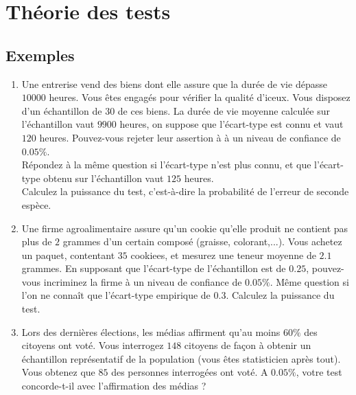 \section{Théorie des tests}

\subsection{Exemples}
\begin{enumerate}
\item Une entrerise vend des biens dont elle assure que la durée de vie dépasse $10000$ heures. Vous êtes engagés pour vérifier la qualité d'iceux. Vous disposez d'un échantillon de $30$ de ces biens. La durée de vie moyenne calculée sur l'échantillon vaut $9900$ heures, on suppose que l'écart-type est connu et vaut $120$ heures. Pouvez-vous rejeter leur assertion à à un niveau de confiance de $0.05\%$.\\
Répondez à la même question si l'écart-type n'est plus connu, et que l'écart-type obtenu sur l'échantillon vaut $125$ heures.\\
Calculez la puissance du test, c'est-à-dire la probabilité de l'erreur de seconde espèce.

\item Une firme agroalimentaire assure qu'un cookie qu'elle produit ne contient pas plus de $2$ grammes d'un certain composé (graisse, colorant,...). Vous achetez un paquet, contentant $35$ cookiees, et mesurez une teneur moyenne de $2.1$ grammes. En supposant que l'écart-type de l'échantillon est de $0.25$, pouvez-vous incriminez la firme à un niveau de confiance de $0.05\%$. Même question si l'on ne connaît que l'écart-type empirique de $0.3$. Calculez la puissance du test.

\item Lors des dernières élections, les médias affirment qu'au moins $60\%$ des citoyens ont voté. Vous interrogez $148$ citoyens de façon à obtenir un échantillon représentatif de la population (vous êtes statisticien après tout). Vous obtenez que $85$ des personnes interrogées ont voté. A $0.05\%$, votre test concorde-t-il  avec l'affirmation des médias ?
\end{enumerate}
